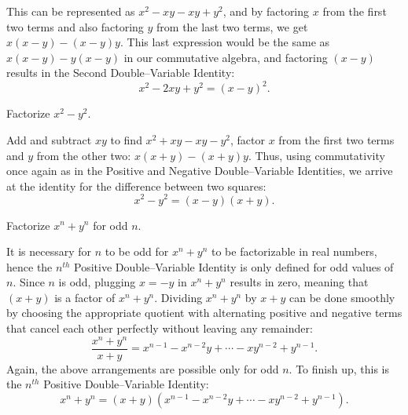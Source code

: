 \documentclass[12pt,a4paper]{memoir}
\theoremstyle{definition}
\begin{document}
\begin{solution}[name=Solution by Amir Parvardi]
	This can be represented as $x^2-xy-xy+y^2$, and by factoring $x$ from the first two terms and also factoring $y$ from the last two terms, we get $x(x-y)-(x-y)y$. This last expression would be the same as $x(x-y)-y(x-y)$ in our commutative algebra, and factoring $(x-y)$ results in the Second Double--Variable Identity: $$x^2-2xy+y^2=(x-y)^2.$$
\end{solution}




\begin{tcolorbox}
	\begin{question}[name=(Difference of Squares Identity)]
		Factorize $x^2 - y^2$.
	\end{question}
\end{tcolorbox}


\begin{solution}[name=Solution by Amir Parvardi]
	Add and subtract $xy$ to find $x^2+xy-xy-y^2$, factor $x$ from the first two terms and $y$ from the other two: $x(x+y)-(x+y)y$. Thus, using commutativity once again as in the Positive and Negative Double--Variable Identities, we arrive at the identity for the difference between two squares: $$x^2-y^2=(x-y)(x+y).$$
\end{solution}

\begin{tcolorbox}
	\begin{question}[name=($n^{\text{th}}$ Positive Double--Variable Identity)]
		Factorize $x^n+y^n$ for odd $n$.
	\end{question}
\end{tcolorbox}

\begin{solution}[name=Solution by Amir Parvardi]
	It is necessary for $n$ to be odd for $x^n+y^n$ to be factorizable in real numbers, hence the $n^{th}$ Positive Double--Variable Identity is only defined for odd values of $n$. Since $n$ is odd, plugging $x=-y$ in $x^n+y^n$ results in zero, meaning that $(x+y)$ is a factor of $x^n+y^n$. Dividing $x^n+y^n$ by $x+y$ can be done smoothly by choosing the appropriate quotient with alternating positive and negative terms that cancel each other perfectly without leaving any remainder:
	$$\frac{x^n+y^n}{x+y} = x^{n-1}-x^{n-2}y+\cdots-xy^{n-2}+y^{n-1}.$$
	Again, the above arrangements are possible only for odd $n$. To finish up, this is the $n^{th}$ Positive Double--Variable Identity:
	$$x^n+y^n = (x+y)\left(x^{n-1}-x^{n-2}y+\cdots-xy^{n-2}+y^{n-1}\right).$$
\end{solution}
\end{document}
